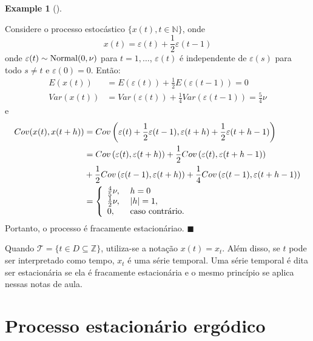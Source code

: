 \documentclass[
  letterpaper,
  DIV=11,
  numbers=noendperiod]{scrreprt}
\theoremstyle{plain}
\theoremstyle{definition}
\newtheorem{example}{Example}[chapter]
\theoremstyle{definition}
\theoremstyle{remark}
\begin{document}
\begin{example}[]\protect\hypertarget{exm-fracamente1}{}\label{exm-fracamente1}

Considere o processo estocástico \(\{x(t),t\in\mathbb{N}\}\), onde
\[x(t) = \varepsilon(t) +\frac{1}{2}\varepsilon(t-1)
\] onde \(\varepsilon(t)\sim\hbox{Normal}(0,\nu)\) para \(t=1,\ldots\),
\(\varepsilon(t)\) é independente de \(\varepsilon(s)\) para todo
\(s\neq t\) e \(\varepsilon(0)=0\). Então: \[\begin{align}
E(x(t))&=E(\varepsilon(t))+\frac{1}{2}E(\varepsilon(t-1))=0\\
Var(x(t))&=Var(\varepsilon(t))+\frac{1}{4}Var(\varepsilon(t-1))=\frac{5}{4}\nu
\end{align}
\] e \[\begin{align}
          Cov(x(t),x(t+h))&=Cov\left(\varepsilon(t)+\frac{1}{2}\varepsilon(t-1),\varepsilon(t+h)+\frac{1}{2}\varepsilon(t+h-1)\right)\\
          &=Cov\left(\varepsilon(t),\varepsilon(t+h)\right)+\frac{1}{2}Cov\left(\varepsilon(t),\varepsilon(t+h-1)\right)\\
          &+\frac{1}{2}Cov\left(\varepsilon(t-1),\varepsilon(t+h)\right)+\frac{1}{4}Cov\left(\varepsilon(t-1),\varepsilon(t+h-1)\right)\\
          &=\left\{ \begin{array}{ll}
          \frac{4}{5}\nu,&\; h = 0 \\         
          \frac{1}{2}\nu,&\; |h|=1,\\
          0,&\;\hbox{caso contrário.}
          \end{array} \right.
    \end{align}\] Portanto, o processo é fracamente estacionáriao.
\(\blacksquare\)

\end{example}

Quando \(\mathcal{T}=\{t\in D\subseteq \mathbb{Z}\}\), utiliza-se a
notação \(x(t)=x_t\). Além disso, se \(t\) pode ser interpretado como
tempo, \(x_t\) é uma série temporal. Uma série temporal é dita ser
estacionária se ela é fracamente estacionária e o mesmo princípio se
aplica nessas notas de aula.

\hypertarget{processo-estacionuxe1rio-erguxf3dico}{%
\section{Processo estacionário
ergódico}\label{processo-estacionuxe1rio-erguxf3dico}}
\end{document}
